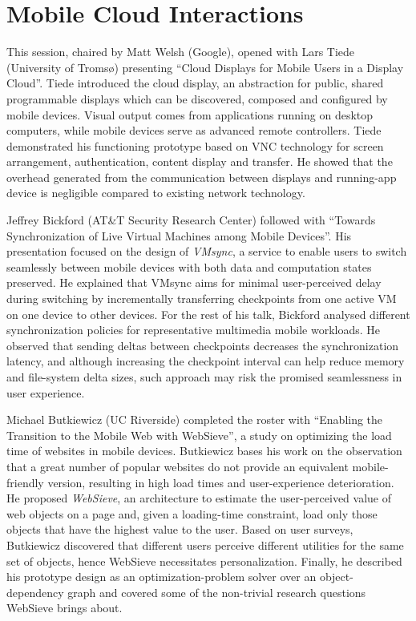 \section{Mobile Cloud Interactions}
\label{sec:mobilecloud}

This session, chaired by Matt Welsh (Google), opened with Lars Tiede
(University of Tromsø) presenting ``Cloud Displays for Mobile Users in a
Display Cloud''. Tiede introduced the cloud display, an abstraction for
public, shared programmable displays which can be discovered, composed
and configured by mobile devices. Visual output comes from
applications running on desktop computers, while mobile devices serve as
advanced remote controllers. Tiede demonstrated his functioning
prototype based on VNC technology for screen arrangement,
authentication, content display and transfer. He showed that the
overhead generated from the communication between displays and
running-app device is negligible compared to existing network
technology.

Jeffrey Bickford (AT\&T Security Research Center) followed with
``Towards Synchronization of Live Virtual Machines among Mobile
Devices''. His presentation focused on the design of \emph{VMsync}, a
service to enable users to switch seamlessly between mobile devices
with both data and computation states preserved. He explained that VMsync
aims for minimal user-perceived delay during switching by incrementally
transferring checkpoints from one active VM on one device to other
devices. For the rest of his talk, Bickford analysed different
synchronization policies for representative multimedia mobile workloads.
He observed that sending deltas between checkpoints decreases the
synchronization latency, and although increasing the checkpoint interval
can help reduce memory and file-system delta sizes, such approach may
risk the promised seamlessness in user experience.

Michael Butkiewicz (UC Riverside) completed the roster with ``Enabling
the Transition to the Mobile Web with WebSieve'', a study on optimizing
the load time of websites in mobile devices. Butkiewicz bases his work
on the observation that a great number of popular websites do
not provide an equivalent mobile-friendly version, resulting in high
load times and user-experience deterioration. He proposed
\emph{WebSieve}, an architecture to estimate the user-perceived value of
web objects on a page and, given a loading-time constraint, load only
those objects that have the highest value to the user. Based on user
surveys, Butkiewicz discovered that different users perceive different
utilities for the same set of objects, hence WebSieve necessitates
personalization.  Finally, he described his prototype design as an
optimization-problem solver over an object-dependency graph and covered
some of the non-trivial research questions WebSieve brings about.
